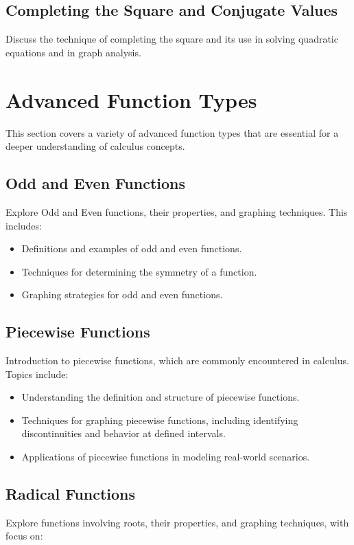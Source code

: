 \documentclass[a4paper,12pt]{book}
\begin{document}
\subsection{Completing the Square and Conjugate Values}
\label{subsec:completing_square_conjugate_values}
Discuss the technique of completing the square and its use in solving quadratic equations and in graph analysis.


\section{Advanced Function Types}
\label{sec:advanced_function_types}
This section covers a variety of advanced function types that are essential for a deeper understanding of calculus concepts.


\subsection{Odd and Even Functions}
\label{subsec:odd_even_functions}
Explore Odd and Even functions, their properties, and graphing techniques. This includes:


\begin{itemize}
    \item Definitions and examples of odd and even functions.
    \item Techniques for determining the symmetry of a function.
    \item Graphing strategies for odd and even functions.
\end{itemize}


\subsection{Piecewise Functions}
\label{subsec:piecewise_functions}
Introduction to piecewise functions, which are commonly encountered in calculus. Topics include:


\begin{itemize}
    \item Understanding the definition and structure of piecewise functions.
    \item Techniques for graphing piecewise functions, including identifying discontinuities and behavior at defined intervals.
    \item Applications of piecewise functions in modeling real-world scenarios.
\end{itemize}


\subsection{Radical Functions}
\label{subsec:radical_functions}
Explore functions involving roots, their properties, and graphing techniques, with focus on:
\end{document}
